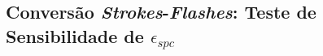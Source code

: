 \begin{anexosenv}

\partanexos

\chapter{Conversão \textit{Strokes}-\textit{Flashes}: Teste de Sensibilidade de $\epsilon_{spc}$}
\label{anexo_conversao}


\end{anexosenv}
